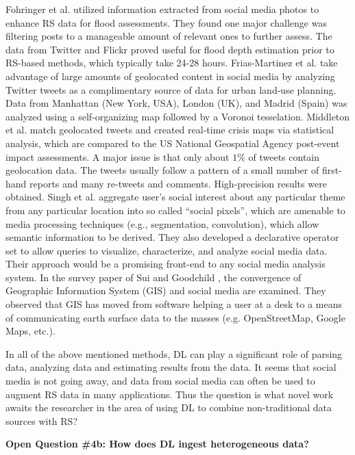 \documentclass[12pt]{spieman}
\newcommand{\ParSection}[1]{}
\begin{document}
\begin{spacing}{1}
Fohringer et al. \cite{Fohringer2015NonTraditional} utilized information extracted from social media photos to enhance RS data for flood assessments. They found one major challenge was filtering posts to a manageable amount of relevant ones to further assess. The data from Twitter and Flickr proved useful for flood depth estimation prior to RS-based methods, which typically take 24-28 hours. Frias-Martinez et al. \cite{Frias-Martinez2014Spectral} take advantage of large amounts of geolocated content in social media by analyzing Twitter tweets as a complimentary source of data for urban land-use planning. Data from Manhattan (New York, USA), London (UK), and Madrid (Spain) was analyzed using a self-organizing map \cite{kohonen1998self} followed by a Voronoi tesselation. Middleton et al. \cite{middleton2014real} match geolocated tweets and created real-time crisis maps via statistical analysis, which are compared to the US National Geospatial Agency post-event impact assessments. A major issue is that only about $1\%$ of tweets contain geolocation data. The tweets usually follow a pattern of a small number of first-hand reports and many re-tweets and comments. High-precision results were obtained. Singh et al. \cite{Singh2010Social} aggregate user's social interest about any particular theme from any particular location into so called ``social pixels'', which are amenable to media processing techniques (e.g., segmentation, convolution), which allow semantic information to be derived. They also developed a declarative operator set to allow queries to visualize, characterize, and analyze social media data. Their approach would be a promising front-end to any social media analysis system. In the survey paper of Sui and Goodchild \cite{Sui2011Convergence} , the convergence of Geographic Information System (GIS) and social media are examined. They observed that GIS has moved from software helping a user at a desk to a means of communicating earth surface data to the masses (e.g. OpenStreetMap, Google Maps, etc.).

In all of the above mentioned methods, DL can play a significant role of parsing data, analyzing data and estimating results from the data. It seems that social media is not going away, and data from social media can often be used to augment RS data in many applications. Thus the question is what novel work awaits the researcher in the area of using DL to combine non-traditional data sources with RS?

\ParSection{Data Fusion}
\textbf{Open Question \#4b: How does DL ingest heterogeneous data?}


\end{spacing}
\end{document}
